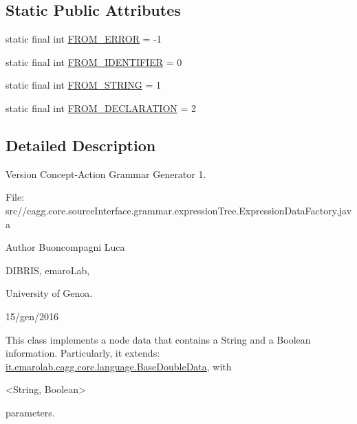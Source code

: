 \subsection*{Static Public Attributes}
\begin{DoxyCompactItemize}
\item 
static final int \hyperlink{classit_1_1emarolab_1_1cagg_1_1core_1_1language_1_1syntax_1_1expressionTree_1_1ExpressionDataFactory_1_1ExpressionTermData_a69fdfa47ae87965a1913011ef655fdb4}{F\-R\-O\-M\-\_\-\-E\-R\-R\-O\-R} = -\/1
\item 
static final int \hyperlink{classit_1_1emarolab_1_1cagg_1_1core_1_1language_1_1syntax_1_1expressionTree_1_1ExpressionDataFactory_1_1ExpressionTermData_a47ff9900ae9a392118de8e056b1f334c}{F\-R\-O\-M\-\_\-\-I\-D\-E\-N\-T\-I\-F\-I\-E\-R} = 0
\item 
static final int \hyperlink{classit_1_1emarolab_1_1cagg_1_1core_1_1language_1_1syntax_1_1expressionTree_1_1ExpressionDataFactory_1_1ExpressionTermData_a721daea5805288e2fbe0aa006e41b1bc}{F\-R\-O\-M\-\_\-\-S\-T\-R\-I\-N\-G} = 1
\item 
static final int \hyperlink{classit_1_1emarolab_1_1cagg_1_1core_1_1language_1_1syntax_1_1expressionTree_1_1ExpressionDataFactory_1_1ExpressionTermData_ab7b629b4ac570eba986cfb0ed8ca3b48}{F\-R\-O\-M\-\_\-\-D\-E\-C\-L\-A\-R\-A\-T\-I\-O\-N} = 2
\end{DoxyCompactItemize}


\subsection{Detailed Description}
\begin{DoxyVersion}{Version}
Concept-\/\-Action Grammar Generator 1. \par
 File\-: src//cagg.core.\-source\-Interface.\-grammar.\-expression\-Tree.\-Expression\-Data\-Factory.\-java \par

\end{DoxyVersion}
\begin{DoxyAuthor}{Author}
Buoncompagni Luca \par
 D\-I\-B\-R\-I\-S, emaro\-Lab,\par
 University of Genoa. \par
 15/gen/2016 \par

\end{DoxyAuthor}


This class implements a node data that contains a String and a Boolean information. Particularly, it extends\-: \hyperlink{}{it.\-emarolab.\-cagg.\-core.\-language.\-Base\-Double\-Data}, with
\begin{DoxyCode}
<String, Boolean> 
\end{DoxyCode}
 parameters.\par


